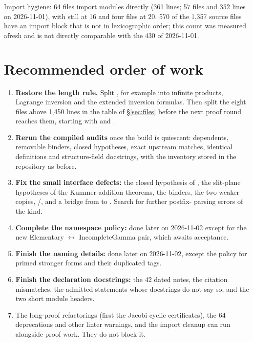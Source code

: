 \documentclass[11pt,a4paper]{article}
\begin{document}
Import hygiene: 64 files import  modules directly (361 lines; 57 files
and 352 lines on 2026-11-01), with  still at 16 and four
files at 20. 570 of the 1{,}357 source files have an import block that is not in
lexicographic order; this count was measured afresh and is not directly comparable with the
430 of 2026-11-01.

\section{Recommended order of work}

\begin{enumerate}
  \item \textbf{Restore the length rule.} Split
    , for example into infinite products,
    Lagrange inversion and the extended inversion formulas. Then split the eight files above
    1{,}450 lines in the table of \S\ref{sec:files} before the next proof round reaches
    them, starting with  and
    .
  \item \textbf{Rerun the compiled audits} once the build is quiescent: 
    dependents, removable binders, closed hypotheses, exact upstream matches, identical
    definitions and structure-field docstrings, with the inventory stored in the repository as
    before.
  \item \textbf{Fix the small interface defects:} the closed hypothesis of
    , the slit-plane hypotheses of the Kummer addition
    theorems, the  binders, the two weaker  copies,
    /, and a bridge from  to
    . Search for further postfix- parsing errors of the
     kind.
  \item \textbf{Complete the namespace policy:} done later on 2026-11-02 except for the new
    Elementary $\leftrightarrow$ IncompleteGamma pair, which awaits acceptance.
  \item \textbf{Finish the naming details:} done later on 2026-11-02, except the policy for
    primed stronger forms and their duplicated tags.
  \item \textbf{Finish the declaration docstrings:} the 42 dated notes, the citation
    mismatches, the admitted statements whose docstrings do not say so, and the two short
    module headers.
  \item The long-proof refactorings (first the Jacobi cyclic certificates), the 64
    deprecations and other linter warnings, and the import cleanup can run alongside proof
    work. They do not block it.
\end{enumerate}
\end{document}
